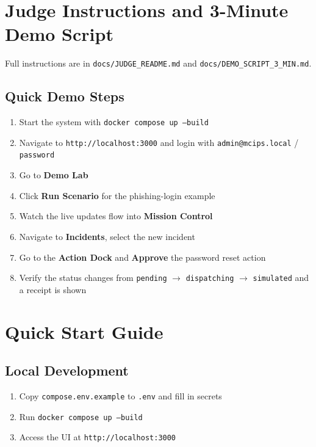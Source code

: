 \documentclass[12pt,a4paper,twoside]{report}
\begin{document}
\clearpage

\chapter{Judge Instructions and 3-Minute Demo Script}
\label{chap:demo}

Full instructions are in \texttt{docs/JUDGE\_README.md} and \texttt{docs/DEMO\_SCRIPT\_3\_MIN.md}.

\section{Quick Demo Steps}
\begin{enumerate}
    \item Start the system with \texttt{docker compose up --build}
    \item Navigate to \texttt{http://localhost:3000} and login with \texttt{admin@mcips.local} / \texttt{password}
    \item Go to \textbf{Demo Lab}
    \item Click \textbf{Run Scenario} for the phishing-login example
    \item Watch the live updates flow into \textbf{Mission Control}
    \item Navigate to \textbf{Incidents}, select the new incident
    \item Go to the \textbf{Action Dock} and \textbf{Approve} the password reset action
    \item Verify the status changes from \texttt{pending} $\to$ \texttt{dispatching} $\to$ \texttt{simulated} and a receipt is shown
\end{enumerate}

\clearpage

\appendix

\chapter{Quick Start Guide}
\label{app:quickstart}
\section{Local Development}
\begin{enumerate}[noitemsep]
    \item Copy \texttt{compose.env.example} to \texttt{.env} and fill in secrets
    \item Run \texttt{docker compose up --build}
    \item Access the UI at \texttt{http://localhost:3000}
\end{enumerate}
\end{document}
